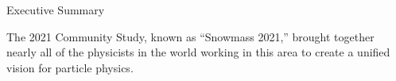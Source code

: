 


\begin{center}\begin{Large}  Executive Summary   \end{Large}\end{center} 

The 2021 Community Study, known as “Snowmass 2021,” brought together nearly all of the physicists in the world working in this area to create a unified vision for particle physics.



